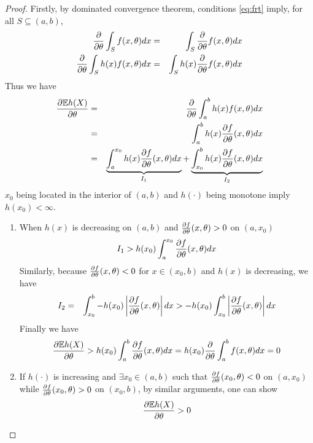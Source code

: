 \documentclass[11pt,a4]{amsart}
\newcommand{\pd}{\partial}
\newcommand{\E }{{\mathbb E}}
\newcommand{\1}{{\mathbf 1}}
\begin{document}
\begin{proof}
  Firstly, by dominated convergence theorem, conditions \eqref{eq:frt}
  imply, for all $S \subseteq (a, b)$,
  \begin{eqnarray*}
    {\pd \over \pd \theta}\int_S f(x, \theta) dx
    &=&
    \int_S {\pd \over \pd \theta} f(x, \theta) dx \\
    {\pd \over \pd \theta}\int_S h(x) f(x, \theta) dx
    &=&
    \int_S h(x) {\pd \over \pd \theta} f(x, \theta) dx \\
  \end{eqnarray*}
  Thus we have
  \begin{eqnarray*}
    {\pd \E h(X) \over \pd \theta}
    &=&
    {\pd \over \pd \theta}
    \int_a^b h(x)
    f(x, \theta) dx \\
    &=& \int_a^b h(x)
    {\pd f \over \pd \theta}(x, \theta) dx \\
    &=& \underbrace{\int_a^{x_0}
      h(x) {\pd f \over \pd \theta}(x, \theta) dx}_{I_1}
    + \underbrace{\int_{x_0}^b
      h(x) {\pd f \over \pd \theta}(x,
      \theta) dx}_{I_2}
  \end{eqnarray*}
  $x_0$ being located in the interior of $(a, b)$ and
  $h(\cdot)$ being monotone imply $h(x_0) < \infty$.
  \begin{enumerate}
  \item When $h(x)$ is decreasing on $(a, b)$ and ${\pd f \over \pd
    \theta}(x, \theta) > 0$ on $(a, x_0)$
    \[
    I_1 > h(x_0) \int_a^{x_0}
    {\pd f \over \pd \theta}(x, \theta) dx
    \]
    Similarly, because ${\pd f \over \pd \theta}(x, \theta) < 0$ for
    $x \in (x_0, b)$ and $h(x)$ is decreasing, we have
    \begin{eqnarray*}
      I_2 &=& \int_{x_0}^b -h(x_0)
      \left|{\pd f \over \pd \theta}(x, \theta) \right| dx
      > -h(x_0)
      \int_{x_0}^b \left| 
        {\pd f \over \pd \theta}(x, \theta)
      \right| dx
    \end{eqnarray*}
    Finally we have
    \begin{eqnarray*}
      {\pd \E h(X) \over \pd \theta}
      > h(x_0) \int_a^b
      {\pd f \over \pd \theta}(x, \theta) dx
      = h(x_0) {\partial \over \partial \theta}
      \int_a^b f(x, \theta) dx
      = 0
    \end{eqnarray*}
  \item If $h(\cdot)$ is increasing and $\exists x_0 \in (a, b)$ such that 
    ${\pd f \over \pd \theta}(x_0, \theta) < 0$ on $(a, x_0)$  while
    ${\pd f \over \pd \theta}(x_0, \theta) > 0$ on $(x_0, b)$, 
    by similar arguments, one can show
    \[
    {\pd \E h(X) \over \pd \theta}> 0
    \]
\end{enumerate}
\end{proof}
\end{document}
